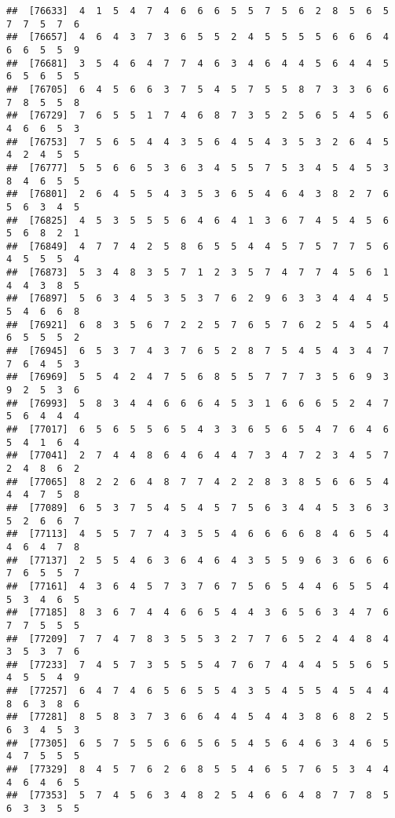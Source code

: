 \documentclass[
]{book}
\begin{document}
\begin{verbatim}
##  [76633]  4  1  5  4  7  4  6  6  6  5  5  7  5  6  2  8  5  6  5  7  7  5  7  6
##  [76657]  4  6  4  3  7  3  6  5  5  2  4  5  5  5  5  6  6  6  4  6  6  5  5  9
##  [76681]  3  5  4  6  4  7  7  4  6  3  4  6  4  4  5  6  4  4  5  6  5  6  5  5
##  [76705]  6  4  5  6  6  3  7  5  4  5  7  5  5  8  7  3  3  6  6  7  8  5  5  8
##  [76729]  7  6  5  5  1  7  4  6  8  7  3  5  2  5  6  5  4  5  6  4  6  6  5  3
##  [76753]  7  5  6  5  4  4  3  5  6  4  5  4  3  5  3  2  6  4  5  4  2  4  5  5
##  [76777]  5  5  6  6  5  3  6  3  4  5  5  7  5  3  4  5  4  5  3  8  4  6  5  5
##  [76801]  2  6  4  5  5  4  3  5  3  6  5  4  6  4  3  8  2  7  6  5  6  3  4  5
##  [76825]  4  5  3  5  5  5  6  4  6  4  1  3  6  7  4  5  4  5  6  5  6  8  2  1
##  [76849]  4  7  7  4  2  5  8  6  5  5  4  4  5  7  5  7  7  5  6  4  5  5  5  4
##  [76873]  5  3  4  8  3  5  7  1  2  3  5  7  4  7  7  4  5  6  1  4  4  3  8  5
##  [76897]  5  6  3  4  5  3  5  3  7  6  2  9  6  3  3  4  4  4  5  5  4  6  6  8
##  [76921]  6  8  3  5  6  7  2  2  5  7  6  5  7  6  2  5  4  5  4  6  5  5  5  2
##  [76945]  6  5  3  7  4  3  7  6  5  2  8  7  5  4  5  4  3  4  7  7  6  4  5  3
##  [76969]  5  5  4  2  4  7  5  6  8  5  5  7  7  7  3  5  6  9  3  9  2  5  3  6
##  [76993]  5  8  3  4  4  6  6  6  4  5  3  1  6  6  6  5  2  4  7  5  6  4  4  4
##  [77017]  6  5  6  5  5  6  5  4  3  3  6  5  6  5  4  7  6  4  6  5  4  1  6  4
##  [77041]  2  7  4  4  8  6  4  6  4  4  7  3  4  7  2  3  4  5  7  2  4  8  6  2
##  [77065]  8  2  2  6  4  8  7  7  4  2  2  8  3  8  5  6  6  5  4  4  4  7  5  8
##  [77089]  6  5  3  7  5  4  5  4  5  7  5  6  3  4  4  5  3  6  3  5  2  6  6  7
##  [77113]  4  5  5  7  7  4  3  5  5  4  6  6  6  6  8  4  6  5  4  4  6  4  7  8
##  [77137]  2  5  5  4  6  3  6  4  6  4  3  5  5  9  6  3  6  6  6  7  6  5  5  7
##  [77161]  4  3  6  4  5  7  3  7  6  7  5  6  5  4  4  6  5  5  4  5  3  4  6  5
##  [77185]  8  3  6  7  4  4  6  6  5  4  4  3  6  5  6  3  4  7  6  7  7  5  5  5
##  [77209]  7  7  4  7  8  3  5  5  3  2  7  7  6  5  2  4  4  8  4  3  5  3  7  6
##  [77233]  7  4  5  7  3  5  5  5  4  7  6  7  4  4  4  5  5  6  5  4  5  5  4  9
##  [77257]  6  4  7  4  6  5  6  5  5  4  3  5  4  5  5  4  5  4  4  8  6  3  8  6
##  [77281]  8  5  8  3  7  3  6  6  4  4  5  4  4  3  8  6  8  2  5  6  3  4  5  3
##  [77305]  6  5  7  5  5  6  6  5  6  5  4  5  6  4  6  3  4  6  5  4  7  5  5  5
##  [77329]  8  4  5  7  6  2  6  8  5  5  4  6  5  7  6  5  3  4  4  4  6  4  6  5
##  [77353]  5  7  4  5  6  3  4  8  2  5  4  6  6  4  8  7  7  8  5  6  3  3  5  5

\end{verbatim}
\end{document}
